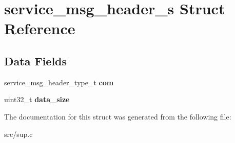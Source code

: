 \hypertarget{structservice__msg__header__s}{}\section{service\+\_\+msg\+\_\+header\+\_\+s Struct Reference}
\label{structservice__msg__header__s}
\subsection*{Data Fields}
\begin{DoxyCompactItemize}
\item 
\mbox{\label{structservice__msg__header__s_aa9dba6cba28392569a1df88878e58e77}} 
service\+\_\+msg\+\_\+header\+\_\+type\+\_\+t {\bfseries com}
\item 
\mbox{\label{structservice__msg__header__s_af6115d3bf800e88d22c01b29cbcaedaa}} 
uint32\+\_\+t {\bfseries data\+\_\+size}
\end{DoxyCompactItemize}


The documentation for this struct was generated from the following file\+:\begin{DoxyCompactItemize}
\item 
src/sup.\+c\end{DoxyCompactItemize}
